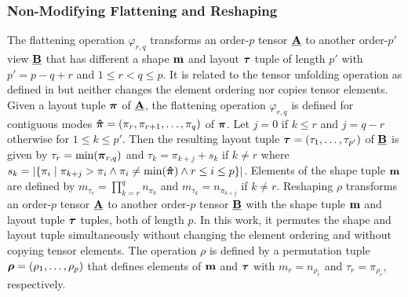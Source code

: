 \subsubsection{Non-Modifying Flattening and Reshaping}
\label{sec:preliminaries:flattening.reshaping}
The flattening operation $\varphi_{r,q}$ transforms an order-$p$ tensor $\underline{\mathbf{A}}$ to another order-$p'$ view $\underline{\mathbf{B}}$ that has different a shape $\mathbf{m}$ and layout $\boldsymbol{\tau}$ tuple of length $p'$ with $p' = p-q+r$ and $1 \leq r < q \leq p$.
It is related to the tensor unfolding operation as defined in \cite[p.459]{kolda:2009:decompositions} but neither changes the element ordering nor copies tensor elements.
Given a layout tuple $\boldsymbol{\pi}$ of $\underline{\mathbf{A}}$, the flattening operation $\varphi_{r,q}$ is defined for contiguous modes $\boldsymbol{\hat{\pi}} = (\pi_r,\pi_{r+1}, \dots, \pi_{q})$ of $\boldsymbol{\pi}$.
Let $j = 0$ if $k \leq r$ and $j = q-r$ otherwise for $1 \leq k \leq p'$.
Then the resulting layout tuple $\boldsymbol{\tau} = (\tau_1,\dots,\tau_{p'})$ of $\underline{\mathbf{B}}$ is given by $\tau_r = \min(\boldsymbol{\pi}_{r,q})$ and $\tau_{k} = \pi_{k+j} + s_k$ if $k \neq r$ where $s_k = \left| \{ \pi_i \mid \pi_{k+j} > \pi_i \wedge \pi_i \neq \min(\boldsymbol{\hat{\pi}}) \wedge r \leq i \leq p \} \right|$.
Elements of the shape tuple $\mathbf{m}$ are defined by $m_{\tau_r} = \prod_{k=r}^q n_{\pi_k}$ and $m_{\tau_k} = n_{\pi_{k+j}}$ if $k \neq r$.
Reshaping $\rho$ transforms an order-$p$ tensor $\underline{\mathbf{A}}$ to another order-$p$ tensor $\underline{\mathbf{B}}$ with the shape tuple $\mathbf{m}$ and layout tuple $\boldsymbol{\tau}$ tuples, both of length $p$.
In this work, it permutes the shape and layout tuple simultaneously without changing the element ordering and without copying tensor elements.
The operation $\rho$ is defined by a permutation tuple $\boldsymbol{\rho} = (\rho_1,\dots,\rho_p)$ that defines elements of $\mathbf{m}$ and $\boldsymbol{\tau}$ with $m_r = n_{\rho_r}$ and $\tau_r = \pi_{\rho_r}$, respectively.
\vspace{-1em}

